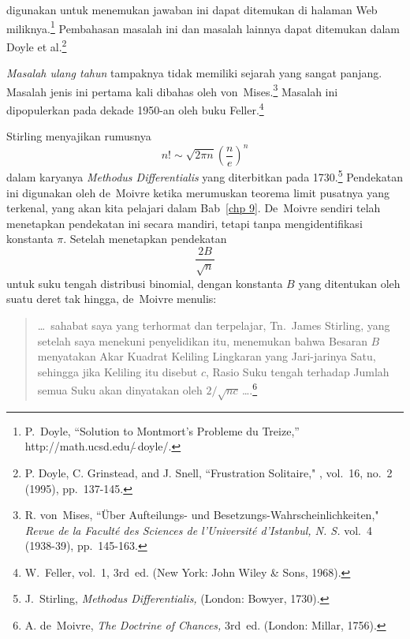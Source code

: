 digunakan untuk menemukan jawaban ini dapat ditemukan di halaman Web miliknya.\footnote{P.~Doyle, ``Solution to Montmort's Probleme du Treize,''
http://math.ucsd.edu/$\tilde{\ }$doyle/.}  Pembahasan masalah ini dan masalah lainnya
dapat ditemukan dalam Doyle et al.\footnote{P. Doyle, C. Grinstead, and J. Snell, ``Frustration Solitaire,"
, vol.\ 16, no.\ 2 (1995), pp.~137-145.}
\par
{\em Masalah ulang tahun} tampaknya tidak memiliki sejarah yang sangat panjang.  Masalah
jenis ini pertama kali dibahas oleh von~Mises.\footnote{R. von~Mises, ``\"Uber
Aufteilungs- und Besetzungs-Wahrscheinlichkeiten," {\em Revue de la Facult\'e des
Sciences de l'Universit\'e d'Istanbul, N. S.} vol.~4 (1938-39), pp.~145-163.}  Masalah ini
dipopulerkan pada dekade 1950-an oleh buku Feller.\footnote{W.~Feller,  vol.~1, 3rd~ed. (New York: John Wiley \&
Sons, 1968).}
\par
Stirling menyajikan rumusnya
$$ n! \sim \sqrt{2\pi n}\left(\frac{n}{e}\right)^n
$$ dalam karyanya {\em Methodus Differentialis} yang diterbitkan pada
1730.\footnote{J.~Stirling, {\em Methodus Differentialis,} (London: Bowyer,
1730).}  Pendekatan ini digunakan oleh de~Moivre ketika merumuskan teorema limit pusatnya
yang terkenal, yang akan kita pelajari dalam Bab~\ref{chp 9}.  De~Moivre sendiri telah
menetapkan pendekatan ini secara mandiri, tetapi tanpa mengidentifikasi konstanta $\pi$.
Setelah menetapkan pendekatan
$$
\frac{2B}{\sqrt n}
$$ untuk suku tengah distribusi binomial, dengan konstanta $B$ yang ditentukan oleh
suatu deret tak hingga, de~Moivre menulis:
\begin{quote}
\dots~sahabat saya yang terhormat dan terpelajar, Tn.\ James Stirling, yang setelah saya
menekuni penyelidikan itu, menemukan bahwa Besaran $B$ menyatakan Akar Kuadrat Keliling
Lingkaran yang Jari-jarinya Satu, sehingga jika Keliling itu disebut $c$, Rasio Suku
tengah terhadap Jumlah semua Suku akan dinyatakan oleh
$2/\sqrt{nc}\,$\dots.\footnote{A. de~Moivre, {\em The Doctrine of Chances,}
3rd~ed. (London: Millar, 1756).}
\end{quote}

